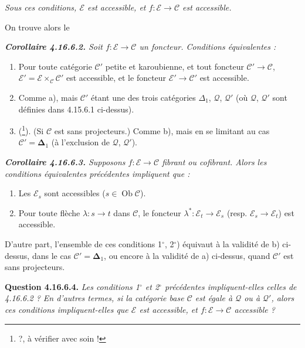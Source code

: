 \documentclass[11pt]{article}
\newcommand{\printedpage}[1]{\marginpar{\footnotesize p.~#1}}
\newcommand{\msp}[1]{\marginpar{\footnotesize [#1]}}
\newcommand{\cE}{\mathcal{E}}
\newcommand{\cC}{\mathcal{C}}
\newcommand{\Ob}{\operatorname{Ob}}
\newcommand{\cQ}{\mathcal{Q}}
\begin{document}
\textit{Sous ces conditions, $\mathcal{E}$ est accessible, et $f : \mathcal{E} \longrightarrow \mathcal{C}$ est accessible.}

\setcounter{footnote}{195}

\printedpage{184}

\msp{page 475}
On trouve alors le

\begingroup\itshape
\noindent\textbf{\upshape Corollaire 4.16.6.2.} Soit $f : \cE \longrightarrow \cC$ un foncteur. Conditions équivalentes :
\begin{enumerate}[label={}]
\item[a)] Pour toute catégorie $\cC'$ \textup{petite} et \textup{karoubienne}, et tout foncteur $\cC' \longrightarrow \cC$, $\cE' = \cE \times_{\cC} \cC'$ est accessible, et le foncteur $\cE' \longrightarrow \cC'$ est accessible.
\item[b)] Comme a), mais $\cC'$ étant une des trois catégories $\Delta_1$, $\cQ$, $\cQ'$ (où $\cQ$, $\cQ'$ sont définies dans 4.15.6.1 ci-dessus).
\item[b$'$)] \textup{(}\footnote{?, à vérifier avec soin !}\textup{)}. (Si $\cC$ est sans projecteurs.) Comme b), mais en se limitant au cas $\cC' = \boldsymbol{\Delta}_1$ (à l'exclusion de $\cQ$, $\cQ'$).
\end{enumerate}
\endgroup

\begingroup\itshape
\noindent\textbf{\upshape Corollaire 4.16.6.3.} Supposons $f : \cE \longrightarrow \cC$ fibrant ou cofibrant. Alors les conditions équivalentes précédentes impliquent que :
\begin{enumerate}[label={}]
\item[1$^\circ$)] Les $\cE_s$ sont accessibles ($s \in \Ob \cC$).
\item[2$^\circ$)] Pour toute flèche $\lambda : s \longrightarrow t$ dans $\cC$, le foncteur $\lambda^* : \cE_t \longrightarrow \cE_s$ (resp. $\cE_s \longrightarrow \cE_t$) est accessible.
\end{enumerate}
\noindent D'autre part, l'ensemble de ces conditions 1$^\circ$, 2$^\circ$) équivaut à la validité de b) ci-dessus, dans le cas $\cC' = \boldsymbol{\Delta}_1$, ou encore à la validité
\msp{page 476}
de a) ci-dessus, quand $\cC'$ est \textup{sans projecteurs}.
\endgroup

\textbf{Question 4.16.6.4.} \textit{Les conditions 1$^\circ$ et 2$^\circ$ précédentes impliquent-elles celles de 4.16.6.2 ? En d'autres termes, si la catégorie base $\cC$ est égale à $\cQ$ ou à $\cQ'$, alors ces conditions impliquent-elles que $\cE$ est accessible, et $f : \cE \longrightarrow \cC$ accessible ?}
\end{document}
